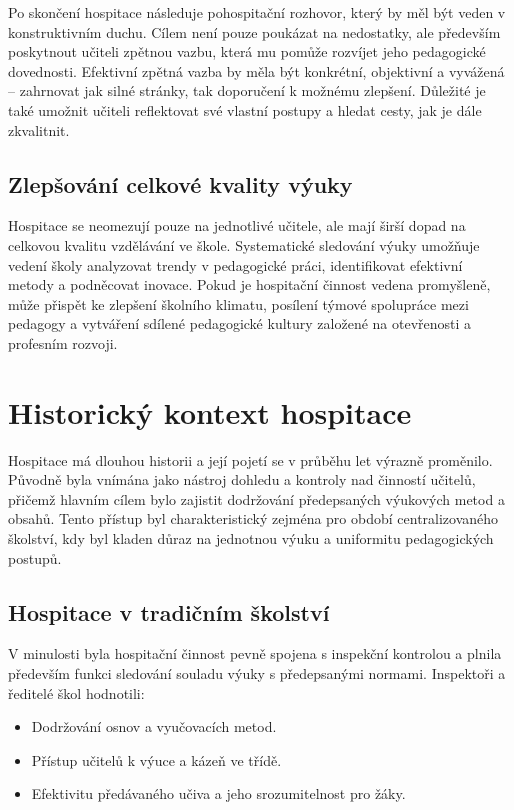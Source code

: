 Po skončení hospitace následuje pohospitační rozhovor, který by měl být veden v konstruktivním duchu. Cílem není pouze poukázat na nedostatky, ale především poskytnout učiteli zpětnou vazbu, která mu pomůže rozvíjet jeho pedagogické dovednosti. Efektivní zpětná vazba by měla být konkrétní, objektivní a vyvážená – zahrnovat jak silné stránky, tak doporučení k možnému zlepšení. Důležité je také umožnit učiteli reflektovat své vlastní postupy a hledat cesty, jak je dále zkvalitnit.

\subsection{Zlepšování celkové kvality výuky}

Hospitace se neomezují pouze na jednotlivé učitele, ale mají širší dopad na celkovou kvalitu vzdělávání ve škole. Systematické sledování výuky umožňuje vedení školy analyzovat trendy v pedagogické práci, identifikovat efektivní metody a podněcovat inovace. Pokud je hospitační činnost vedena promyšleně, může přispět ke zlepšení školního klimatu, posílení týmové spolupráce mezi pedagogy a vytváření sdílené pedagogické kultury založené na otevřenosti a profesním rozvoji.


\section{Historický kontext hospitace}

Hospitace má dlouhou historii a její pojetí se v průběhu let výrazně proměnilo. Původně byla vnímána jako nástroj dohledu a kontroly nad činností učitelů, přičemž hlavním cílem bylo zajistit dodržování předepsaných výukových metod a obsahů. Tento přístup byl charakteristický zejména pro období centralizovaného školství, kdy byl kladen důraz na jednotnou výuku a uniformitu pedagogických postupů.

\subsection{Hospitace v tradičním školství}

V minulosti byla hospitační činnost pevně spojena s inspekční kontrolou a plnila především funkci sledování souladu výuky s předepsanými normami. Inspektoři a ředitelé škol hodnotili:

\begin{itemize}
    \item Dodržování osnov a vyučovacích metod.

    \item Přístup učitelů k výuce a kázeň ve třídě.
    
    \item Efektivitu předávaného učiva a jeho srozumitelnost pro žáky.    
\end{itemize}


